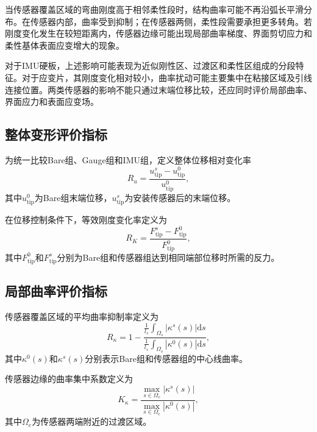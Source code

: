 当传感器覆盖区域的弯曲刚度高于相邻柔性段时，结构曲率可能不再沿弧长平滑分布。在传感器内部，曲率受到抑制；在传感器两侧，柔性段需要承担更多转角。若刚度变化发生在较短距离内，传感器边缘可能出现局部曲率梯度、界面剪切应力和柔性基体表面应变增大的现象。

对于IMU硬板，上述影响可能表现为近似刚性区、过渡区和柔性区组成的分段特征。对于应变片，其刚度变化相对较小，曲率扰动可能主要集中在粘接区域及引线连接位置。两类传感器的影响不能只通过末端位移比较，还应同时评价局部曲率、界面应力和表面应变场。


\subsection{整体变形评价指标}

为统一比较Bare组、Gauge组和IMU组，定义整体位移相对变化率
\begin{equation}
    R_u
    =
    \frac{
    u_{\mathrm{tip}}^{s}
    -
    u_{\mathrm{tip}}^{0}
    }{
    u_{\mathrm{tip}}^{0}
    },
    \label{eq:tip_displacement_change_ratio}
\end{equation}
其中$u_{\mathrm{tip}}^{0}$为Bare组末端位移，$u_{\mathrm{tip}}^{s}$为安装传感器后的末端位移。

在位移控制条件下，等效刚度变化率定义为
\begin{equation}
    R_K
    =
    \frac{
    F_{\mathrm{tip}}^{s}
    -
    F_{\mathrm{tip}}^{0}
    }{
    F_{\mathrm{tip}}^{0}
    },
    \label{eq:equivalent_stiffness_change_ratio}
\end{equation}
其中$F_{\mathrm{tip}}^{0}$和$F_{\mathrm{tip}}^{s}$分别为Bare组和传感器组达到相同端部位移时所需的反力。


\subsection{局部曲率评价指标}

传感器覆盖区域的平均曲率抑制率定义为
\begin{equation}
    R_{\kappa}
    =
    1-
    \frac{
    \displaystyle
    \frac{1}{l_s}
    \int_{\Omega_s}
    \left|
    \kappa^{s}(s)
    \right|
    \mathrm ds
    }{
    \displaystyle
    \frac{1}{l_s}
    \int_{\Omega_s}
    \left|
    \kappa^{0}(s)
    \right|
    \mathrm ds
    },
    \label{eq:curvature_suppression_ratio}
\end{equation}
其中$\kappa^{0}(s)$和$\kappa^{s}(s)$分别表示Bare组和传感器组的中心线曲率。

传感器边缘的曲率集中系数定义为
\begin{equation}
    K_{\kappa}
    =
    \frac{
    \displaystyle
    \max_{s\in\Omega_e}
    \left|
    \kappa^{s}(s)
    \right|
    }{
    \displaystyle
    \max_{s\in\Omega_e}
    \left|
    \kappa^{0}(s)
    \right|
    },
    \label{eq:edge_curvature_concentration}
\end{equation}
其中$\Omega_e$为传感器两端附近的过渡区域。

